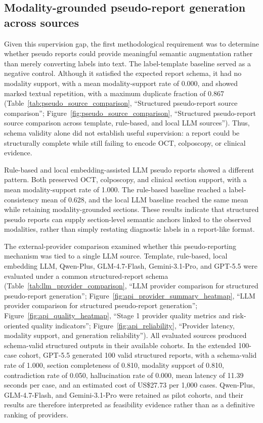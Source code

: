 \subsection{Modality-grounded pseudo-report generation across sources}
\label{subsec:pseudo_report_results}

Given this supervision gap, the first methodological requirement was to determine whether pseudo reports could provide meaningful semantic augmentation rather than merely converting labels into text. The label-template baseline served as a negative control. Although it satisfied the expected report schema, it had no modality support, with a mean modality-support rate of 0.000, and showed marked textual repetition, with a maximum duplicate fraction of 0.867 (Table~\ref{tab:pseudo_source_comparison}, ``Structured pseudo-report source comparison''; Figure~\ref{fig:pseudo_source_comparison}, ``Structured pseudo-report source comparison across template, rule-based, and local LLM sources''). Thus, schema validity alone did not establish useful supervision: a report could be structurally complete while still failing to encode OCT, colposcopy, or clinical evidence.

Rule-based and local embedding-assisted LLM pseudo reports showed a different pattern. Both preserved OCT, colposcopy, and clinical section support, with a mean modality-support rate of 1.000. The rule-based baseline reached a label-consistency mean of 0.628, and the local LLM baseline reached the same mean while retaining modality-grounded sections. These results indicate that structured pseudo reports can supply section-level semantic anchors linked to the observed modalities, rather than simply restating diagnostic labels in a report-like format.

The external-provider comparison examined whether this pseudo-reporting mechanism was tied to a single LLM source. Template, rule-based, local embedding LLM, Qwen-Plus, GLM-4.7-Flash, Gemini-3.1-Pro, and GPT-5.5 were evaluated under a common structured-report schema (Table~\ref{tab:llm_provider_comparison}, ``LLM provider comparison for structured pseudo-report generation''; Figure~\ref{fig:api_provider_summary_heatmap}, ``LLM provider comparison for structured pseudo-report generation''; Figure~\ref{fig:api_quality_heatmap}, ``Stage 1 provider quality metrics and risk-oriented quality indicators''; Figure~\ref{fig:api_reliability}, ``Provider latency, modality support, and generation reliability''). All evaluated sources produced schema-valid structured outputs in their available cohorts. In the extended 100-case cohort, GPT-5.5 generated 100 valid structured reports, with a schema-valid rate of 1.000, section completeness of 0.810, modality support of 0.810, contradiction rate of 0.050, hallucination rate of 0.000, mean latency of 11.39 seconds per case, and an estimated cost of US\$27.73 per 1,000 cases. Qwen-Plus, GLM-4.7-Flash, and Gemini-3.1-Pro were retained as pilot cohorts, and their results are therefore interpreted as feasibility evidence rather than as a definitive ranking of providers.

